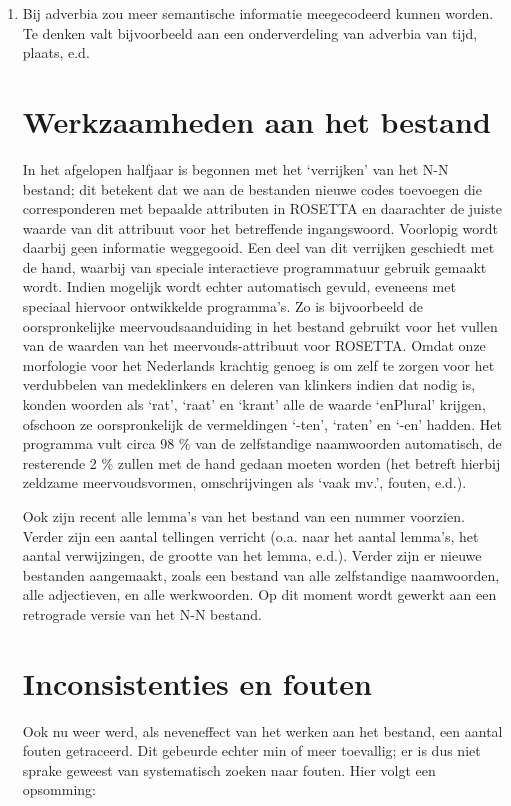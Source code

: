 \begin{enumerate}
  \item  Bij adverbia zou meer semantische informatie meegecodeerd kunnen 
worden. Te denken valt bijvoorbeeld aan een onderverdeling van adverbia van 
tijd, plaats, e.d. 

\section{Werkzaamheden aan het bestand}

In het afgelopen halfjaar is begonnen met het `verrijken' van het N-N bestand; 
dit betekent dat we aan de bestanden nieuwe codes toevoegen die corresponderen 
met bepaalde attributen in ROSETTA en daarachter de juiste waarde van dit 
attribuut
voor het betreffende ingangswoord. Voorlopig wordt daarbij geen informatie
weggegooid. Een deel van dit verrijken geschiedt met de hand, waarbij van 
speciale interactieve programmatuur gebruik gemaakt wordt. Indien mogelijk 
wordt echter automatisch gevuld, eveneens met speciaal hiervoor ontwikkelde
programma's. Zo is bijvoorbeeld de oorspronkelijke meervoudsaanduiding in het
bestand gebruikt voor het vullen van de waarden van het meervouds-attribuut 
voor ROSETTA. Omdat onze morfologie voor het Nederlands krachtig genoeg is om
zelf te zorgen voor het verdubbelen van medeklinkers en deleren van klinkers 
indien dat nodig is, konden woorden als `rat', `raat' en `krant' alle de
waarde `enPlural' krijgen, ofschoon ze oorspronkelijk de vermeldingen
`-ten', `raten' en `-en' hadden. Het programma vult circa 98 \% van de 
zelfstandige naamwoorden automatisch, de resterende 2 \% zullen met de hand
gedaan moeten worden (het betreft hierbij zeldzame meervoudsvormen,
omschrijvingen als `vaak mv.', fouten, e.d.).

Ook zijn recent alle lemma's van het bestand van een nummer voorzien. Verder
zijn een aantal tellingen verricht (o.a. naar het aantal lemma's, het aantal
verwijzingen, de grootte van het lemma, e.d.). Verder zijn er nieuwe bestanden
aangemaakt, zoals een bestand van alle zelfstandige naamwoorden, alle 
adjectieven, en alle werkwoorden. Op dit moment wordt gewerkt aan een retrograde
versie van het N-N bestand.

\section{Inconsistenties en fouten}

Ook nu weer werd, als neveneffect van het werken aan het bestand, een aantal
fouten getraceerd. Dit gebeurde echter min of meer toevallig; er is dus niet
sprake geweest van systematisch zoeken naar fouten. Hier volgt een opsomming:


\end{enumerate}
